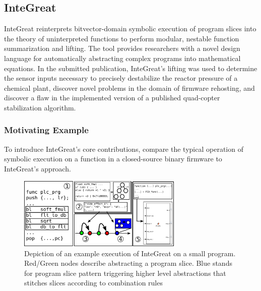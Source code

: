 \subsection{InteGreat}

InteGreat reinterprets bitvector-domain symbolic execution of program slices into the theory of uninterpreted functions to perform modular, nestable function summarization and lifting.
The tool provides researchers with a novel design language for automatically abstracting complex programs into mathematical equations.
In the submitted publication, InteGreat's lifting was used to determine the sensor inputs necessary to precisely destabilize the reactor pressure of a chemical plant, discover novel problems in the domain of firmware rehosting, and discover a flaw in the implemented version of a published quad-copter stabilization algorithm.

\subsubsection{Motivating Example}

To introduce InteGreat's core contributions, compare the typical operation of symbolic execution on a function in a closed-source binary firmware to InteGreat's approach.

\begin{figure}
  \centering
	\includegraphics[width=0.7\textwidth]{integreat-example.png}
	\caption{Depiction of an example execution of InteGreat on a small program. Red/Green nodes describe abstracting a program slice. Blue stands for program slice pattern triggering higher level abstractions that stitches slices according to combination rules}
	\label{fig:integreat-example}
\end{figure}

